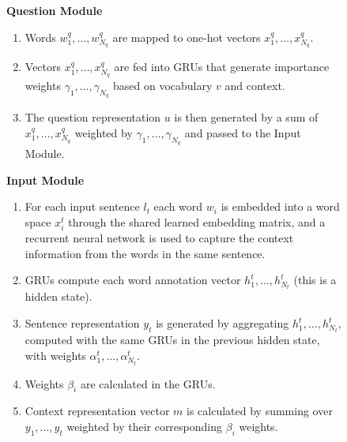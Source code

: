 \documentclass[12pt]{article}
\theoremstyle{remark}
\begin{document}
\begin{figure}[!htb]
	\textbf{Question Module}
	\begin{enumerate}[wide, labelwidth=!, labelindent=0pt]
		\item Words $w_1^q, \dots, w_{N_q}^q$ are mapped to one-hot vectors $x_1^q, \dots, x_{N_q}^q$.
		\item Vectors $x_1^q, \dots, x_{N_q}^q$ are fed into GRUs that generate importance weights $\gamma_1, \dots, \gamma_{N_q}$ based on vocabulary $v$ and context.
		\item The question representation $u$ is then generated by a sum of $x_1^q, \dots, x_{N_q}^q$ weighted by $\gamma_1, \dots, \gamma_{N_q}$ and passed to the Input Module.
	\end{enumerate}
	\endminipage\hfill
\end{figure}

\newpage

\begin{figure}[!htb]
	\textbf{Input Module}
	\begin{enumerate}[wide, labelwidth=!, labelindent=0pt]
		\item For each input sentence $l_t$ each word $w_i$ is embedded into a word space $x_i^t$ through the shared learned embedding matrix, and a recurrent neural network is used to capture the context information from the words in the same sentence.
		\item GRUs compute each word annotation vector $h_1^t, \dots, h_{N_t}^t$ (this is a hidden state).
		\item Sentence representation $y_t$ is generated by aggregating $h_1^t, \dots, h_{N_t}^t$, computed with the same GRUs in the previous hidden state, with weights $\alpha_1^t, \dots, \alpha_{N_t}^t$.
		\item Weights $\beta_i$ are calculated in the GRUs.
		\item Context representation vector $m$ is calculated by summing over $y_1, \dots, y_t$ weighted by their corresponding $\beta_i$ weights. 
	\end{enumerate}
	\endminipage\hfill
\end{figure}
\end{document}
